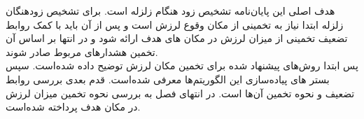 هدف اصلی این پایان‌نامه تشخیص زود هنگام زلزله است. برای تشخیص زودهنگان زلزله ابتدا نیاز به تخمینی از مکان وقوع لرزش است و پس از آن باید با کمک روابط تضعیف تخمینی از میزان لرزش در مکان های هدف ارائه شود و در انتها بر اساس آن تخمین هشدارهای مربوط صادر شوند.
\\ 
پس ابتدا روش‌های پیشنهاد شده برای تخمین مکان لرزش توضیح داده شده‌است.
سپس بستر های پیاده‌سازی این الگوریتم‌ها معرفی شد‌‌ه‌است.
قدم بعدی بررسی روابط تضعیف و نحوه تخمین آن‌ها است. در انتهای فصل به بررسی نحوه تخمین میزان لرزش در مکان هدف پرداخته شده‌است.